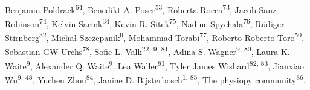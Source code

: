 \documentclass[12pt,a4paper]{proc}
\begin{document}
{Benjamin Poldrack\textsuperscript{64}, %
Benedikt A. Poser\textsuperscript{53}, %
Roberta Rocca\textsuperscript{73}, %
Jacob Sanz-Robinson\textsuperscript{74}, %
Kelvin Sarink\textsuperscript{34}, %
Kevin R. Sitek\textsuperscript{75}, %
Nadine Spychala\textsuperscript{76}, %
Rüdiger Stirnberg\textsuperscript{32}, %
Michał Szczepanik\textsuperscript{9}, %
Mohammad Torabi\textsuperscript{77}, %
Roberto Roberto Toro\textsuperscript{50}, %
Sebastian GW Urchs\textsuperscript{78}, %
Sofie L. Valk\textsuperscript{22, 9, 81}, %
Adina S. Wagner\textsuperscript{9, 80}, %
Laura K. Waite\textsuperscript{9}, %
Alexander Q. Waite\textsuperscript{9}, %
Lea Waller\textsuperscript{81}, %
Tyler James Wishard\textsuperscript{82, 83}, %
Jianxiao Wu\textsuperscript{9, 48}, %
Yuchen Zhou\textsuperscript{84}, %
Janine D. Bijsterbosch\textsuperscript{1, 85}, %
The physiopy community\textsuperscript{86}, %
}
\\
\end{document}
